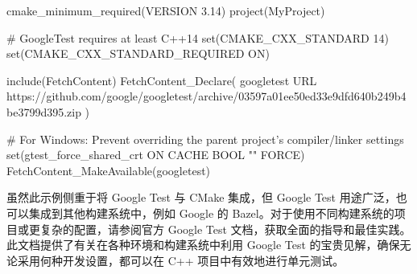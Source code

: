 \begin{cmake}
cmake_minimum_required(VERSION 3.14)
project(MyProject)

# GoogleTest requires at least C++14
set(CMAKE_CXX_STANDARD 14)
set(CMAKE_CXX_STANDARD_REQUIRED ON)

include(FetchContent)
FetchContent_Declare(
    googletest
    URL https://github.com/google/googletest/archive/03597a01ee50ed33e9dfd640b249b4be3799d395.zip
)

# For Windows: Prevent overriding the parent project's compiler/linker settings
set(gtest_force_shared_crt ON CACHE BOOL "" FORCE)
FetchContent_MakeAvailable(googletest)
\end{cmake}

虽然此示例侧重于将 Google Test 与 CMake 集成，但 Google Test 用途广泛，也可以集成到其他构建系统中，例如 Google 的 Bazel。对于使用不同构建系统的项目或更复杂的配置，请参阅官方 Google Test 文档，获取全面的指导和最佳实践。此文档提供了有关在各种环境和构建系统中利用 Google Test 的宝贵见解，确保无论采用何种开发设置，都可以在 C++ 项目中有效地进行单元测试。



